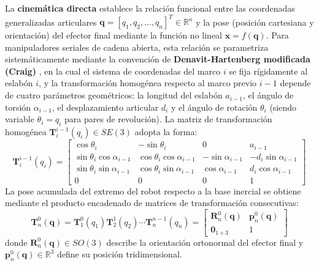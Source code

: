 \documentclass[12pt]{article}
\begin{document}
La \textbf{cinemática directa} establece la relación funcional entre las coordenadas generalizadas articulares $\bm{q} = [q_1, q_2, \dots, q_n]^T \in \mathbb{R}^n$ y la pose (posición cartesiana y orientación) del efector final mediante la función no lineal $\bm{x} = f(\bm{q})$. Para manipuladores seriales de cadena abierta, esta relación se parametriza sistemáticamente mediante la convención de \textbf{Denavit-Hartenberg modificada (Craig)} \cite{craig2005introduction}, en la cual el sistema de coordenadas del marco $i$ se fija rígidamente al eslabón $i$, y la transformación homogénea respecto al marco previo $i-1$ depende de cuatro parámetros geométricos: la longitud del eslabón $a_{i-1}$, el ángulo de torsión $\alpha_{i-1}$, el desplazamiento articular $d_i$ y el ángulo de rotación $\theta_i$ (siendo variable $\theta_i = q_i$ para pares de revolución). La matriz de transformación homogénea $\bm{T}_i^{i-1}(q_i) \in SE(3)$ adopta la forma:
\begin{equation}
\bm{T}_i^{i-1}(q_i) = \begin{bmatrix}
\cos\theta_i & -\sin\theta_i & 0 & a_{i-1} \\
\sin\theta_i\cos\alpha_{i-1} & \cos\theta_i\cos\alpha_{i-1} & -\sin\alpha_{i-1} & -d_i\sin\alpha_{i-1} \\
\sin\theta_i\sin\alpha_{i-1} & \cos\theta_i\sin\alpha_{i-1} & \cos\alpha_{i-1} & d_i\cos\alpha_{i-1} \\
0 & 0 & 0 & 1
\end{bmatrix}
\label{eq:dh_craig_matrix}
\end{equation}
La pose acumulada del extremo del robot respecto a la base inercial se obtiene mediante el producto encadenado de matrices de transformación consecutivas:
\begin{equation}
\bm{T}_n^0(\bm{q}) = \bm{T}_1^0(q_1)\bm{T}_2^1(q_2) \cdots \bm{T}_n^{n-1}(q_n) = \begin{bmatrix} \bm{R}_n^0(\bm{q}) & \bm{p}_n^0(\bm{q}) \\ \bm{0}_{1 \times 3} & 1 \end{bmatrix}
\label{eq:fwd_kinematics_chain}
\end{equation}
donde $\bm{R}_n^0(\bm{q}) \in SO(3)$ describe la orientación ortonormal del efector final y $\bm{p}_n^0(\bm{q}) \in \mathbb{R}^3$ define su posición tridimensional.
\end{document}
